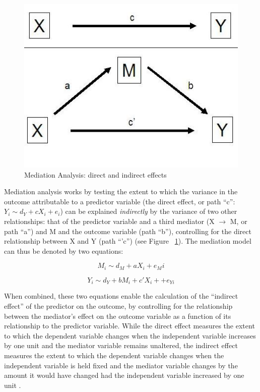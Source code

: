 \begin{figure}[htbp]
  \begin{center}
    \includegraphics[scale = .5]{images/mediation_image.jpg}
    \caption{Mediation Analysis: direct and indirect effects}
    \label{fig:mediationAnalysis}
  \end{center}
\end{figure}

Mediation analysis works by testing the extent to which the variance in the outcome attributable to a predictor variable (the direct effect, or path ``c'': $Y_i \sim d_Y + cX_i + e_i$) can be explained \textit{indirectly} by the variance of two other relationships: that of the predictor variable and a third mediator (X $\rightarrow$ M, or path ``a'')  and M and the outcome variable (path ``b''), controlling for the direct relationship between X and Y (path ``'c'') (see Figure ~\ref{fig:mediationAnalysis}). The mediation model can thus be denoted by two equations:

\begin{equation}
  M_i \sim d_M + aX_i + e_Mi
\end{equation}

\begin{equation}
  Y_i \sim d_Y + bM_i + c'X_i +  + e_{Yi}
\end{equation}
\bigskip

When combined, these two equations enable the calculation of the ``indirect effect'' of the predictor on the outcome, by controlling for the relationship between the mediator's effect on the outcome variable as a function of its relationship to the predictor variable.  While the direct effect measures the extent to which the dependent variable changes when the independent variable increases by one unit and the mediator variable remains unaltered, the indirect effect measures the extent to which the dependent variable changes when the independent variable is held fixed and the mediator variable changes by the amount it would have changed had the independent variable increased by one unit \citep{Bauer2006}.

